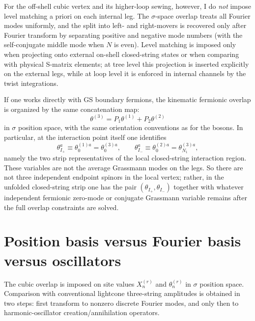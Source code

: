 \documentclass[11pt]{article}
\numberwithin{equation}{section}
\begin{document}
For the off-shell cubic vertex and its higher-loop sewing, however, I do \emph{not} impose level matching a priori on each internal leg. The $\sigma$-space overlap treats all Fourier modes uniformly, and the split into left- and right-movers is recovered only after Fourier transform by separating positive and negative mode numbers (with the self-conjugate middle mode when $N$ is even). Level matching is imposed only when projecting onto external on-shell closed-string states or when comparing with physical S-matrix elements; at tree level this projection is inserted explicitly on the external legs, while at loop level it is enforced in internal channels by the twist integrations.

If one works directly with GS boundary fermions, the kinematic fermionic overlap is organized by the same concatenation map:
\begin{equation}
\label{eq:s9-010}
\theta^{(3)} = P_1 \theta^{(1)} + P_2 \theta^{(2)}
\end{equation}
in $\sigma$ position space, with the same orientation conventions as for the bosons. In particular, at the interaction point itself one identifies
\begin{equation}
\label{eq:s9-011}
\theta_{I_+}^a\equiv \theta_0^{(1)a}=\theta_0^{(3)a},
\qquad
\theta_{I_-}^a\equiv \theta_0^{(2)a}=\theta_{N_1}^{(3)a},
\end{equation}
namely the two strip representatives of the local closed-string interaction region. These variables are not the average Grassmann modes on the legs. So there are not three independent endpoint spinors in the local vertex; rather, in the unfolded closed-string strip one has the pair $(\theta_{I_+},\theta_{I_-})$ together with whatever independent fermionic zero-mode or conjugate Grassmann variable remains after the full overlap constraints are solved.

\section{Position basis versus Fourier basis versus oscillators}
The cubic overlap is imposed on site values $X_n^{(r)}$ and $\theta_n^{(r)}$ in $\sigma$ position space. Comparison with conventional lightcone three-string amplitudes is obtained in two steps: first transform to nonzero discrete Fourier modes, and only then to harmonic-oscillator creation/annihilation operators.
\end{document}

